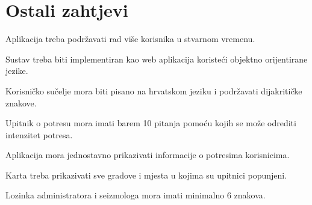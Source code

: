 		\section{Ostali zahtjevi}
				\begin{packed_item}
					\item Aplikacija treba podržavati rad više korisnika u stvarnom vremenu.
					\item Sustav treba biti implementiran kao web aplikacija koristeći objektno orijentirane jezike.
					\item Korisničko sučelje mora biti pisano na hrvatskom jeziku i podržavati dijakritičke znakove.
					\item Upitnik o potresu mora imati barem 10 pitanja pomoću kojih se može odrediti intenzitet potresa.
					\item Aplikacija mora jednostavno prikazivati informacije o potresima korisnicima.
					\item Karta treba prikazivati sve gradove i mjesta u kojima su upitnici popunjeni.
					\item Lozinka administratora i seizmologa mora imati minimalno 6 znakova.
				\end{packed_item}
